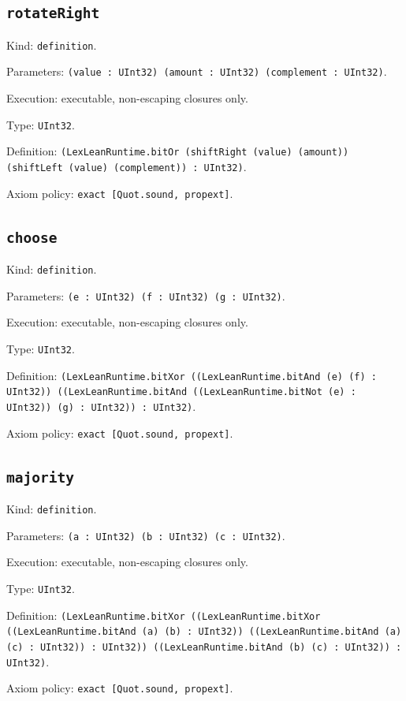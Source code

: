 \documentclass[11pt]{article}
\begin{document}
\subsection*{\texttt{rotateRight}}
\noindent Kind: \texttt{definition}.\par
\noindent Parameters: \texttt{(value : UInt32) (amount : UInt32) (complement : UInt32)}.\par
\noindent Execution: executable, non-escaping closures only.\par
\noindent Type: \texttt{UInt32}.\par
\noindent Definition: \texttt{(LexLeanRuntime.bitOr (shiftRight (value) (amount)) (shiftLeft (value) (complement)) : UInt32)}.\par
\noindent Axiom policy: \texttt{exact [Quot.sound, propext]}.\par
\subsection*{\texttt{choose}}
\noindent Kind: \texttt{definition}.\par
\noindent Parameters: \texttt{(e : UInt32) (f : UInt32) (g : UInt32)}.\par
\noindent Execution: executable, non-escaping closures only.\par
\noindent Type: \texttt{UInt32}.\par
\noindent Definition: \texttt{(LexLeanRuntime.bitXor ((LexLeanRuntime.bitAnd (e) (f) : UInt32)) ((LexLeanRuntime.bitAnd ((LexLeanRuntime.bitNot (e) : UInt32)) (g) : UInt32)) : UInt32)}.\par
\noindent Axiom policy: \texttt{exact [Quot.sound, propext]}.\par
\subsection*{\texttt{majority}}
\noindent Kind: \texttt{definition}.\par
\noindent Parameters: \texttt{(a : UInt32) (b : UInt32) (c : UInt32)}.\par
\noindent Execution: executable, non-escaping closures only.\par
\noindent Type: \texttt{UInt32}.\par
\noindent Definition: \texttt{(LexLeanRuntime.bitXor ((LexLeanRuntime.bitXor ((LexLeanRuntime.bitAnd (a) (b) : UInt32)) ((LexLeanRuntime.bitAnd (a) (c) : UInt32)) : UInt32)) ((LexLeanRuntime.bitAnd (b) (c) : UInt32)) : UInt32)}.\par
\noindent Axiom policy: \texttt{exact [Quot.sound, propext]}.\par
\end{document}
